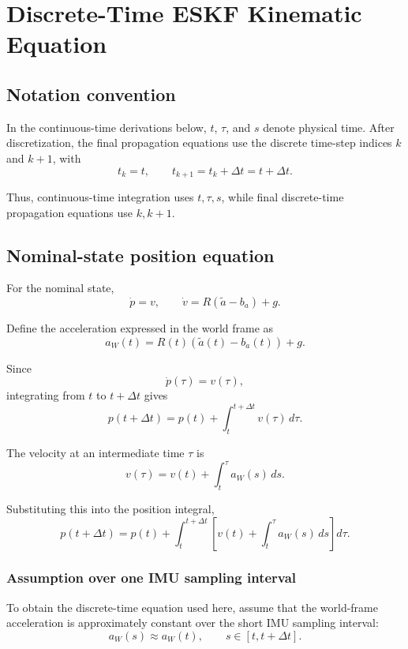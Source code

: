 \documentclass[11pt]{article}
\numberwithin{equation}{section}
\begin{document}
\section{Discrete-Time ESKF Kinematic Equation}

\subsection*{Notation convention}

In the continuous-time derivations below, $t$, $\tau$, and $s$ denote
physical time. After discretization, the final propagation equations
use the discrete time-step indices $k$ and $k+1$, with
\begin{equation}
\boxed{
t_k=t,\qquad t_{k+1}=t_k+\Delta t=t+\Delta t.
}
\end{equation}

Thus, continuous-time integration uses $t,\tau,s$, while final
discrete-time propagation equations use $k,k+1$.


\subsection{Nominal-state position equation}

For the nominal state,
\[
\dot p=v,
\qquad
\dot v=R(\tilde a-b_a)+g.
\]

Define the acceleration expressed in the world frame as
\begin{equation}
\boxed{
a_W(t)=R(t)(\tilde a(t)-b_a(t))+g.
}
\end{equation}

Since
\[
\dot p(\tau)=v(\tau),
\]
integrating from $t$ to $t+\Delta t$ gives
\[
p(t+\Delta t)
=
p(t)+\int_t^{t+\Delta t}v(\tau)\,d\tau.
\]

The velocity at an intermediate time $\tau$ is
\[
v(\tau)
=
v(t)+\int_t^\tau a_W(s)\,ds.
\]

Substituting this into the position integral,
\[
p(t+\Delta t)
=
p(t)+
\int_t^{t+\Delta t}
\left[
v(t)+\int_t^\tau a_W(s)\,ds
\right]d\tau.
\]

\subsubsection*{Assumption over one IMU sampling interval}

To obtain the discrete-time equation used here, assume that the
world-frame acceleration is approximately constant over the short IMU
sampling interval:
\begin{equation}
\boxed{
a_W(s)\approx a_W(t),
\qquad
s\in[t,t+\Delta t].
}
\end{equation}
\end{document}
